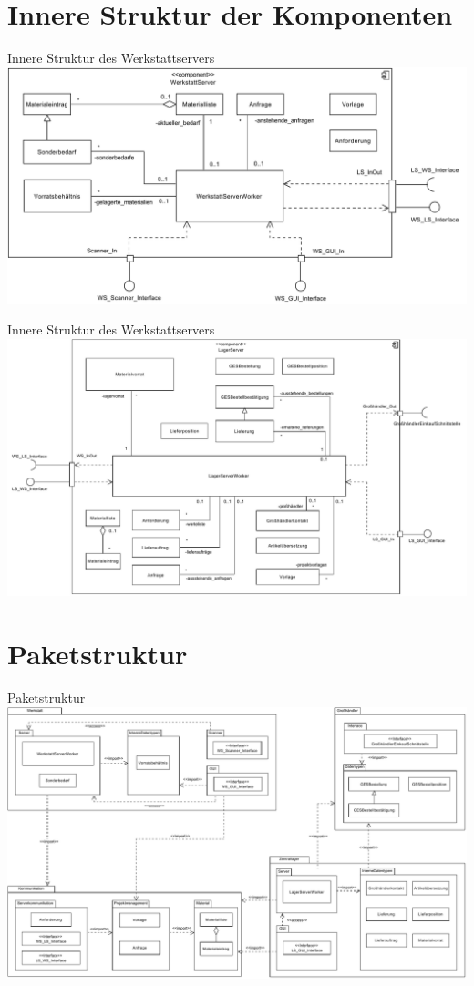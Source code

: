 \documentclass{beamer}
\begin{document}
	\section{ Innere Struktur der Komponenten}
	\begin{frame}{Innere Struktur des Werkstattservers}
		\includegraphics[width=\textwidth]{PDF/WS_Innere_Struktur.pdf}
	\end{frame}
	\begin{frame}{Innere Struktur des Werkstattservers}
		\includegraphics[width=\textwidth]{PDF/LS_Innere_Struktur.pdf}
	\end{frame}
	\section{Paketstruktur}
	\begin{frame}{Paketstruktur}
		\includegraphics[height=0.75 \textheight]{PDF/Paket_Struktur.pdf}
	\end{frame}
\end{document}
